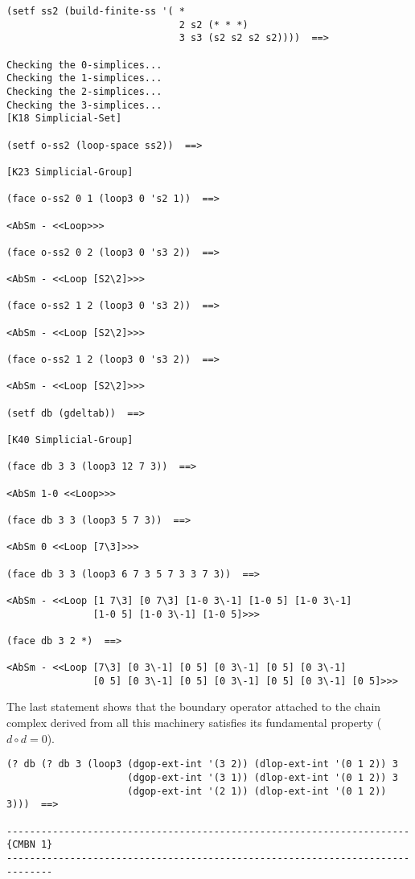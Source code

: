 {\footnotesize\begin{verbatim}
(setf ss2 (build-finite-ss '( * 
                              2 s2 (* * *) 
                              3 s3 (s2 s2 s2 s2))))  ==>

Checking the 0-simplices...
Checking the 1-simplices...
Checking the 2-simplices...
Checking the 3-simplices...
[K18 Simplicial-Set]

(setf o-ss2 (loop-space ss2))  ==>

[K23 Simplicial-Group]

(face o-ss2 0 1 (loop3 0 's2 1))  ==>

<AbSm - <<Loop>>>

(face o-ss2 0 2 (loop3 0 's3 2))  ==>

<AbSm - <<Loop [S2\2]>>>

(face o-ss2 1 2 (loop3 0 's3 2))  ==>

<AbSm - <<Loop [S2\2]>>>

(face o-ss2 1 2 (loop3 0 's3 2))  ==>

<AbSm - <<Loop [S2\2]>>>

(setf db (gdeltab))  ==>

[K40 Simplicial-Group]

(face db 3 3 (loop3 12 7 3))  ==>

<AbSm 1-0 <<Loop>>>

(face db 3 3 (loop3 5 7 3))  ==>

<AbSm 0 <<Loop [7\3]>>>

(face db 3 3 (loop3 6 7 3 5 7 3 3 7 3))  ==>

<AbSm - <<Loop [1 7\3] [0 7\3] [1-0 3\-1] [1-0 5] [1-0 3\-1] 
               [1-0 5] [1-0 3\-1] [1-0 5]>>>

(face db 3 2 *)  ==>

<AbSm - <<Loop [7\3] [0 3\-1] [0 5] [0 3\-1] [0 5] [0 3\-1] 
               [0 5] [0 3\-1] [0 5] [0 3\-1] [0 5] [0 3\-1] [0 5]>>>
\end{verbatim}}
The last  statement shows that the boundary operator attached to
the chain complex derived from all this machinery satisfies its fundamental
property ($d\circ d=0$). 
{\footnotesize\begin{verbatim}
(? db (? db 3 (loop3 (dgop-ext-int '(3 2)) (dlop-ext-int '(0 1 2)) 3
                     (dgop-ext-int '(3 1)) (dlop-ext-int '(0 1 2)) 3
                     (dgop-ext-int '(2 1)) (dlop-ext-int '(0 1 2)) 3)))  ==>

----------------------------------------------------------------------{CMBN 1}
------------------------------------------------------------------------------
\end{verbatim}}

